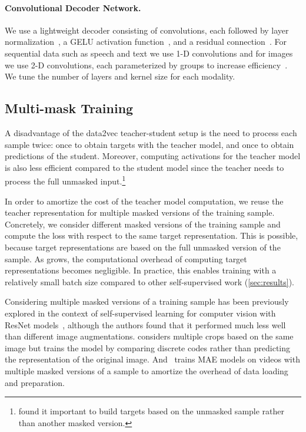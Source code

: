 \documentclass[nohyperref]{article}
\theoremstyle{plain}
\theoremstyle{definition}
\theoremstyle{remark}
\begin{document}
\paragraph{Convolutional Decoder Network.}
We use a lightweight decoder consisting of  convolutions, each followed by layer normalization~\citep{ba2016layer}, a GELU activation function~\citep{hendrycks2016gaussian}, and a residual connection~\citep{he2015deep}.
For sequential data such as speech and text we use 1-D convolutions and for images we use 2-D convolutions, each parameterized by groups to increase efficiency~\citep{krizhevsky2012alexnet}.
We tune the number of layers and kernel size for each modality.



\subsection{Multi-mask Training}
\label{sec:multimask}

A disadvantage of the data2vec teacher-student setup is the need to process each sample twice: once to obtain targets with the teacher model, and once to obtain predictions of the student.
Moreover, computing activations for the teacher model is also less efficient compared to the student model since the teacher needs to process the full unmasked input.\footnote{\citet{baevski2022d2v} found it important to build targets based on the unmasked sample rather than another masked version.} 

In order to amortize the cost of the teacher model computation, we reuse the teacher representation for multiple masked versions of the training sample.
Concretely, we consider  different masked versions of the training sample and compute the loss with respect to the same target representation. 
This is possible, because target representations are based on the full unmasked version of the sample.
As  grows, the computational overhead of computing target representations becomes negligible.
In practice, this enables training with a relatively small batch size compared to other self-supervised work (\textsection\ref{sec:results}).

Considering multiple masked versions of a training sample has been previously explored in the context of self-supervised learning for computer vision with ResNet models~\citep{jing2022maskedsiamese}, although the authors found that it performed much less well than different image augmentations. \citet{caron2020contrastive} considers multiple crops based on the same image but trains the model by comparing discrete codes rather than predicting the representation of the original image.
And~\citet{girdhar2022omnimae} trains MAE models on videos with multiple masked versions of a sample to amortize the overhead of data loading and preparation.
\end{document}
